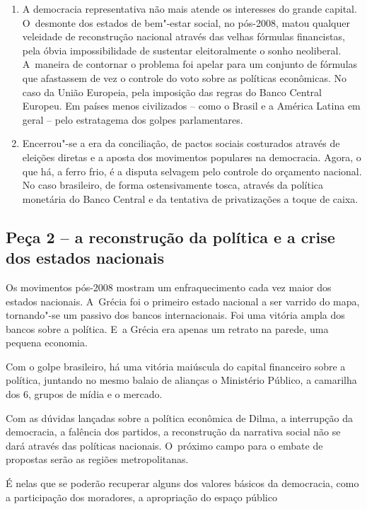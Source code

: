 \begin{enumerate}
\itemsep1pt\parskip0pt
\item
  A democracia representativa não mais atende os interesses do grande
  capital. O~desmonte dos estados de bem"-estar social, no pós-2008,
  matou qualquer veleidade de reconstrução nacional através das velhas
  fórmulas financistas, pela óbvia impossibilidade de sustentar
  eleitoralmente o sonho neoliberal. A~maneira de contornar o problema
  foi apelar para um conjunto de fórmulas que afastassem de vez o
  controle do voto sobre as políticas econômicas. No caso da União
  Europeia, pela imposição das regras do Banco Central Europeu. Em
  países menos civilizados -- como o Brasil e a América Latina em geral
  -- pelo estratagema dos golpes parlamentares.
\item
  Encerrou"-se a era da conciliação, de pactos sociais costurados através
  de eleições diretas e a aposta dos movimentos populares na democracia.
  Agora, o que há, a ferro frio, é a disputa selvagem pelo controle do
  orçamento nacional. No caso brasileiro, de forma ostensivamente tosca,
  através da política monetária do Banco Central e da tentativa de
  privatizações a toque de caixa.
\end{enumerate}

\subsection{Peça 2 -- a reconstrução da política e a crise dos estados
nacionais}

Os movimentos pós-2008 mostram um enfraquecimento cada vez maior dos
estados nacionais. A~Grécia foi o primeiro estado nacional a ser varrido
do mapa, tornando"-se um passivo dos bancos internacionais. Foi uma
vitória ampla dos bancos sobre a política. E~a Grécia era apenas um
retrato na parede, uma pequena economia.

Com o golpe brasileiro, há uma vitória maiúscula do capital financeiro
sobre a política, juntando no mesmo balaio de alianças o Ministério
Público, a camarilha dos 6, grupos de mídia e o mercado.

Com as dúvidas lançadas sobre a política econômica de Dilma, a
interrupção da democracia, a falência dos partidos, a reconstrução da
narrativa social não se dará através das políticas nacionais. O~próximo
campo para o embate de propostas serão as regiões metropolitanas.

É nelas que se poderão recuperar alguns dos valores básicos da
democracia, como a participação dos moradores, a apropriação do espaço
público


